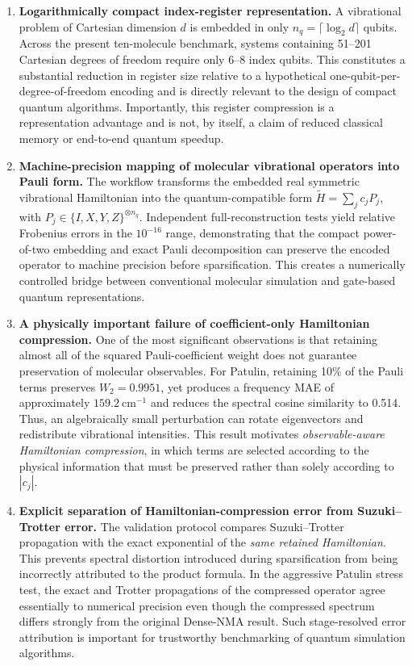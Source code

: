 \documentclass[aip,jcp,reprint,amsmath,amssymb,floatfix]{revtex4-2}
\begin{document}
\begin{enumerate}
    \item \textbf{Logarithmically compact index-register representation.}
    A vibrational problem of Cartesian dimension $d$ is embedded in only
    $n_q=\lceil\log_2 d\rceil$ qubits. Across the present ten-molecule benchmark,
    systems containing 51--201 Cartesian degrees of freedom require only 6--8
    index qubits. This constitutes a substantial reduction in register size
    relative to a hypothetical one-qubit-per-degree-of-freedom encoding and is
    directly relevant to the design of compact quantum algorithms. Importantly,
    this register compression is a representation advantage and is not, by
    itself, a claim of reduced classical memory or end-to-end quantum speedup.

    \item \textbf{Machine-precision mapping of molecular vibrational operators into Pauli form.}
    The workflow transforms the embedded real symmetric vibrational Hamiltonian
    into the quantum-compatible form $\widetilde{H}=\sum_j c_jP_j$, with
    $P_j\in\{I,X,Y,Z\}^{\otimes n_q}$. Independent full-reconstruction tests
    yield relative Frobenius errors in the $10^{-16}$ range, demonstrating that
    the compact power-of-two embedding and exact Pauli decomposition can preserve
    the encoded operator to machine precision before sparsification. This creates
    a numerically controlled bridge between conventional molecular simulation and
    gate-based quantum representations.

    \item \textbf{A physically important failure of coefficient-only Hamiltonian compression.}
    One of the most significant observations is that retaining almost all of the
    squared Pauli-coefficient weight does not guarantee preservation of molecular
    observables. For Patulin, retaining 10\% of the Pauli terms preserves
    $W_2=0.9951$, yet produces a frequency MAE of approximately
    $159.2\ \mathrm{cm}^{-1}$ and reduces the spectral cosine similarity to
    0.514. Thus, an algebraically small perturbation can rotate eigenvectors and
    redistribute vibrational intensities. This result motivates
    \emph{observable-aware Hamiltonian compression}, in which terms are selected
    according to the physical information that must be preserved rather than
    solely according to $|c_j|$.

    \item \textbf{Explicit separation of Hamiltonian-compression error from Suzuki--Trotter error.}
    The validation protocol compares Suzuki--Trotter propagation with the exact
    exponential of the \emph{same retained Hamiltonian}. This prevents spectral
    distortion introduced during sparsification from being incorrectly attributed
    to the product formula. In the aggressive Patulin stress test, the exact and
    Trotter propagations of the compressed operator agree essentially to numerical
    precision even though the compressed spectrum differs strongly from the
    original Dense-NMA result. Such stage-resolved error attribution is important
    for trustworthy benchmarking of quantum simulation algorithms.


\end{enumerate}
\end{document}
